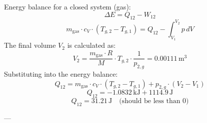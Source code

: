Energy balance for a closed system (gas):  
\[
\Delta E = Q_{12} - W_{12}
\]  
\[
m_{\text{gas}} \cdot c_V \cdot (T_{g,2} - T_{g,1}) = Q_{12} - \int_{V_1}^{V_2} p \, dV
\]  
The final volume \( V_2 \) is calculated as:  
\[
V_2 = \frac{m_{\text{gas}} \cdot R}{M} \cdot T_{g,2} \cdot \frac{1}{p_{2,g}} = 0.00111 \, \text{m}^3
\]  
Substituting into the energy balance:  
\[
Q_{12} = m_{\text{gas}} \cdot c_V \cdot (T_{g,2} - T_{g,1}) + p_{2,g} \cdot (V_2 - V_1)
\]  
\[
Q_{12} = -1.0832 \, \text{kJ} + 1114.9 \, \text{J}
\]  
\[
Q_{12} = 31.21 \, \text{J} \quad \text{(should be less than 0)}
\]  

---